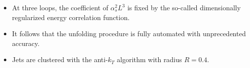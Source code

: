 \begin{itemize}
  \item At three loops, the coefficient of $\alpha_s^2 L^3$ is fixed by the so-called dimensionally regularized energy correlation function.
  \item It follows that the unfolding procedure is fully automated with unprecedented accuracy.
  \item Jets are clustered with the anti-$k_T$ algorithm with radius $R = 0.4$.
\end{itemize}

